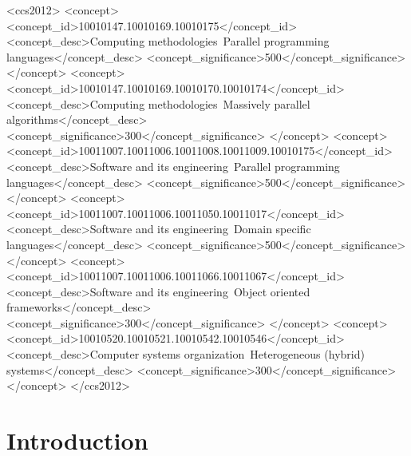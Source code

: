\documentclass[sigplan]{acmart}
\begin{document}
%
\begin{CCSXML}
<ccs2012>
<concept>
<concept_id>10010147.10010169.10010175</concept_id>
<concept_desc>Computing methodologies~Parallel programming languages</concept_desc>
<concept_significance>500</concept_significance>
</concept>
<concept>
<concept_id>10010147.10010169.10010170.10010174</concept_id>
<concept_desc>Computing methodologies~Massively parallel algorithms</concept_desc>
<concept_significance>300</concept_significance>
</concept>
<concept>
<concept_id>10011007.10011006.10011008.10011009.10010175</concept_id>
<concept_desc>Software and its engineering~Parallel programming languages</concept_desc>
<concept_significance>500</concept_significance>
</concept>
<concept>
<concept_id>10011007.10011006.10011050.10011017</concept_id>
<concept_desc>Software and its engineering~Domain specific languages</concept_desc>
<concept_significance>500</concept_significance>
</concept>
<concept>
<concept_id>10011007.10011006.10011066.10011067</concept_id>
<concept_desc>Software and its engineering~Object oriented frameworks</concept_desc>
<concept_significance>300</concept_significance>
</concept>
<concept>
<concept_id>10010520.10010521.10010542.10010546</concept_id>
<concept_desc>Computer systems organization~Heterogeneous (hybrid) systems</concept_desc>
<concept_significance>300</concept_significance>
</concept>
</ccs2012>
\end{CCSXML}




\maketitle

\section{Introduction}
\label{sec:introduction}
\end{document}
